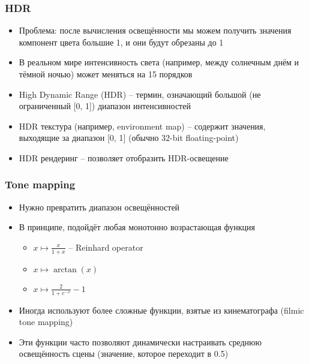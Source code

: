 \documentclass{beamer}
\begin{document}
\begin{frame}[fragile]
\frametitle{HDR}
\begin{itemize}
\item Проблема: после вычисления освещённости мы можем получить значения компонент цвета большие 1, и они будут обрезаны до 1
\pause
\item В реальном мире интенсивность света (например, между солнечным днём и тёмной ночью) может меняться на 15 порядков
\pause
\item High Dynamic Range (HDR) -- термин, означающий большой (не ограниченный [0, 1]) диапазон интенсивностей
\pause
\item HDR текстура (например, environment map) -- содержит значения, выходящие за диапазон [0, 1] (обычно 32-bit floating-point)
\pause
\item HDR рендеринг -- позволяет отобразить HDR-освещение
\end{itemize}
\end{frame}

\begin{frame}[fragile]
\frametitle{Tone mapping}
\begin{itemize}
\item Нужно превратить диапазон освещённостей \begin{math}[0, \infty)\end{math} в диапазон \begin{math}[0, 1]\end{math}
\pause
\item В принципе, подойдёт любая монотонно возрастающая функция \begin{math}[0, \infty)\rightarrow [0, 1]\end{math}
\begin{itemize}
\item \begin{math}x \mapsto \frac{x}{1+x}\end{math} -- Reinhard operator
\item \begin{math}x \mapsto \arctan(x)\end{math}
\item \begin{math}x \mapsto \frac{2}{1+e^{-x}}-1\end{math}
\end{itemize}
\pause
\item Иногда используют более сложные функции, взятые из кинематографа (filmic tone mapping)
\pause
\item Эти функции часто позволяют динамически настраивать среднюю освещённость сцены (значение, которое переходит в 0.5)
\end{itemize}
\end{frame}
\end{document}
